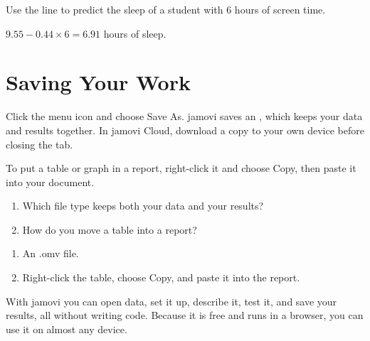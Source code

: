 \begin{Exercise}[title={Making a Prediction}, label={ex:jamovi-predict}]
Use the line to predict the sleep of a student with 6 hours of screen time.
\end{Exercise}
\begin{Answer}[ref={ex:jamovi-predict}]
$9.55 - 0.44 \times 6 = 6.91$ hours of sleep.
\end{Answer}

\section{Saving Your Work}

Click the menu icon and choose Save As. jamovi saves an , which keeps your data and results together. In jamovi Cloud, download a copy to your own device before closing the tab.

To put a table or graph in a report, right-click it and choose Copy, then paste it into your document.

\begin{Exercise}[title={Saving Choices}, label={ex:jamovi-saving}]
\begin{enumerate}
\item Which file type keeps both your data and your results?
\item How do you move a table into a report?
\end{enumerate}
\end{Exercise}
\begin{Answer}[ref={ex:jamovi-saving}]
\begin{enumerate}
\item An .omv file.
\item Right-click the table, choose Copy, and paste it into the report.
\end{enumerate}
\end{Answer}


With jamovi you can open data, set it up, describe it, test it, and save your results, all without writing code. Because it is free and runs in a browser, you can use it on almost any device.
